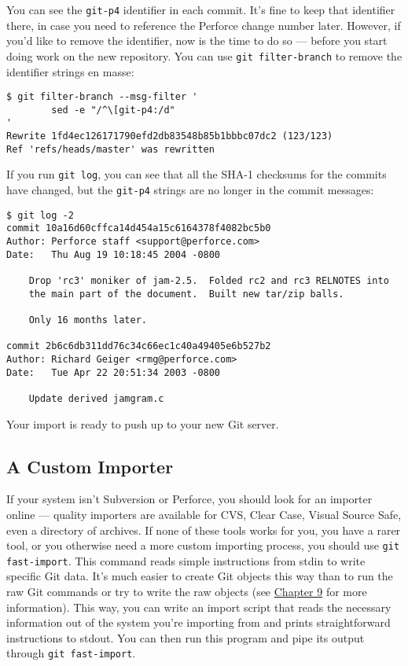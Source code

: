 \documentclass[a4paper]{book}
\newcommand{\prechap}{Chapter }
\newcommand{\postchap}{}
\newcommand{\chapref}[1]{\hyperref[chap:#1]{\prechap #1\postchap}}
\begin{document}
You can see the \texttt{git-p4} identifier in each commit. It's fine to keep that identifier there, in case you need to reference the Perforce change number later. However, if you'd like to remove the identifier, now is the time to do so --- before you start doing work on the new repository. You can use \texttt{git filter-branch} to remove the identifier strings en masse:

\begin{shaded}\begin{verbatim}
$ git filter-branch --msg-filter '
        sed -e "/^\[git-p4:/d"
'
Rewrite 1fd4ec126171790efd2db83548b85b1bbbc07dc2 (123/123)
Ref 'refs/heads/master' was rewritten
\end{verbatim}\end{shaded}

If you run \texttt{git log}, you can see that all the SHA-1 checksums for the commits have changed, but the \texttt{git-p4} strings are no longer in the commit messages:

\begin{shaded}\begin{verbatim}
$ git log -2
commit 10a16d60cffca14d454a15c6164378f4082bc5b0
Author: Perforce staff <support@perforce.com>
Date:   Thu Aug 19 10:18:45 2004 -0800

    Drop 'rc3' moniker of jam-2.5.  Folded rc2 and rc3 RELNOTES into
    the main part of the document.  Built new tar/zip balls.

    Only 16 months later.

commit 2b6c6db311dd76c34c66ec1c40a49405e6b527b2
Author: Richard Geiger <rmg@perforce.com>
Date:   Tue Apr 22 20:51:34 2003 -0800

    Update derived jamgram.c
\end{verbatim}\end{shaded}

Your import is ready to push up to your new Git server.

\subsection{A Custom Importer}

If your system isn't Subversion or Perforce, you should look for an importer online --- quality importers are available for CVS, Clear Case, Visual Source Safe, even a directory of archives. If none of these tools works for you, you have a rarer tool, or you otherwise need a more custom importing process, you should use \texttt{git fast-import}. This command reads simple instructions from stdin to write specific Git data. It's much easier to create Git objects this way than to run the raw Git commands or try to write the raw objects (see \chapref{9} for more information). This way, you can write an import script that reads the necessary information out of the system you're importing from and prints straightforward instructions to stdout. You can then run this program and pipe its output through \texttt{git fast-import}.
\end{document}
